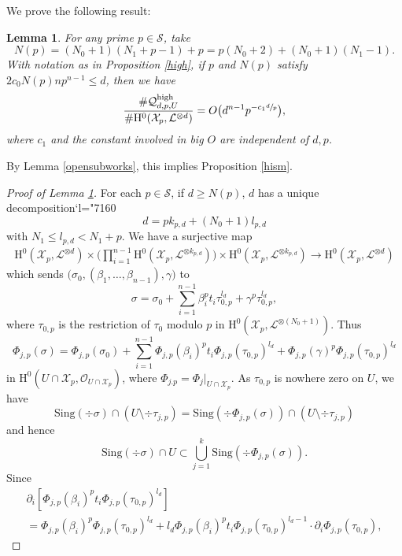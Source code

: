 \documentclass[JEP,XML,SOM,Unicode,published]{cedram}
\newcommand{\Changel}{\mathcode`l="7160}
\theoremstyle{plain}
\newtheorem{lem}[thm]{Lemma}
\theoremstyle{definition}
\newcommand{\ho}{\mathrm{H}}
\newcommand{\X}{\mathcal{X}}
\newcommand{\li}{\mathcal{L}}
\begin{document}
We prove the following result:
\begin{lem}\label{U}
For any prime $p\in \mathcal{S}$, take
\[
N(p)=(N_0+1)(N_1+p-1)+p=p(N_0+2)+(N_0+1)(N_1-1).
\]
With notation as in Proposition \ref{high}, if $p$ and $N(p)$ satisfy $2c_0N(p)np^{n-1}\leq d$, then we have
\[
\frac{\#\mathcal{Q}_{d,p,U}^{\mathrm{high}}}{\#\ho^0(\X_{p}, \li^{\otimes d})}=O\bigl(d^{n-1}p^{-c_1\sfrac{d}{p}} \bigr),
\]
where $c_1$ and the constant involved in big $O$ are independent of $d,p$.
\end{lem}
By Lemma \ref{opensubworks}, this implies Proposition \ref{hism}.
\begin{proof}[Proof of Lemma \ref{U}]
For each $p\in \mathcal{S}$, if $d\geq N(p)$, $d$ has a unique decomposition\vspace*{-3pt}\Changel
\[
d=pk_{p,d}+(N_0+1)l_{p,d}
\]
with $N_1\leq l_{p,d}< N_1+p$. We have a surjective map\vspace*{-3pt}
\begin{align*}
\ho^0(\X_p,\mathcal{L}^{\otimes d})\times \biggl(\prod_{i=1}^{n-1} \ho^0(\X_p,\mathcal{L}^{\otimes k_{p,d}}) \biggr) \times \ho^0(\X_p, \mathcal{L}^{\otimes k_{p,d}}) \to \ho^0(\X_p, \mathcal{L}^{\otimes d})
\end{align*}
which sends $\big(\sigma_{0}, (\beta_1,\dots, \beta_{n-1}), \gamma\big)$ to\vspace*{-3pt}\enlargethispage{.7\baselineskip}%
\[
\sigma=\sigma_{0}+\sum_{i=1}^{n-1} \beta_i^pt_i\tau_{0,p}^{l_d}+\gamma^p\tau_{0,p}^{l_d},
\]
where $\tau_{0,p}$ is the restriction of $\tau_0$ modulo $p$ in $\ho^0(\X_p, \li^{\otimes (N_0+1)})$. Thus\vspace*{-3pt}
\[
\Phi_{j,p}(\sigma)=\Phi_{j,p}(\sigma_0)+\sum_{i=1}^{n-1} \Phi_{j,p}(\beta_i)^pt_i\Phi_{j,p}(\tau_{0,p})^{l_d}+\Phi_{j,p}(\gamma)^p\Phi_{j,p}(\tau_{0,p})^{l_d}
\]
in $\ho^0(U\cap \X_p,\mathcal{O}_{U\cap \X_p})$, where $\Phi_{j.p}=\Phi_j|_{U\cap \X_p}$. As $\tau_{0,p}$ is nowhere zero on $U$, we have
\[
\mathrm{Sing}(\div \sigma)\cap (U\setminus \div \tau_{j,p}) = \mathrm{Sing}(\div \Phi_{j,p}(\sigma))\cap (U\setminus \div \tau_{j,p})
\]
and hence\vspace*{-5pt}
\[
\mathrm{Sing}(\div \sigma)\cap U \subset \bigcup_{j=1}^k \mathrm{Sing}(\div \Phi_{j,p}(\sigma)).
\]
Since\vspace*{-3pt}
\begin{multline*}
\partial_i[\Phi_{j,p}(\beta_i)^p t_i \Phi_{j,p}(\tau_{0,p})^{l_d}]\\[-3pt]=\Phi_{j,p}(\beta_i)^p \Phi_{j,p}(\tau_{0,p})^{l_d} + l_d \Phi_{j,p}(\beta_i)^p t_i \Phi_{j,p}(\tau_{0,p})^{l_d-1}\cdot \partial_i \Phi_{j,p}(\tau_{0,p}),

\end{multline*}
\end{proof}
\end{document}
